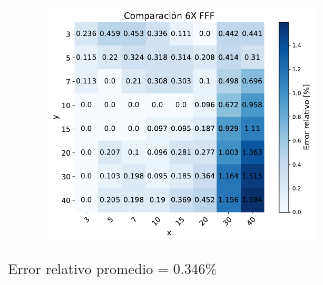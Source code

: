\documentclass[aspectratio=169,xcolor=dvipsnames,t]{beamer}
\begin{document}
\begin{frame}

      \begin{figure}
            \centering
            \includegraphics[width=0.63\textwidth]{6FFF_hm2.pdf}
      \end{figure}

      \vspace{-20pt}
      \begin{flushright}
      \tiny{Error relativo promedio = $0.346 \%$}
      \end{flushright}

\end{frame}


\End
\end{document}
